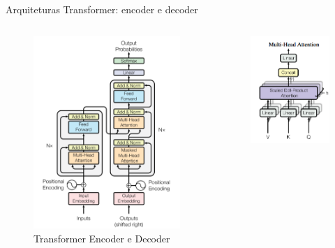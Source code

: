 \documentclass{beamer}
\begin{document}
\begin{frame}{Arquiteturas Transformer: encoder e decoder \cite{vaswani2017attention}}
\begin{columns}[t]	
	\begin{figure}
		\centering
		\includegraphics[height=0.75\textheight]{assets/Transformer.png}
		\caption{Transformer Encoder e Decoder}
	\end{figure}
	\begin{figure}
		\centering
		\includegraphics[height=0.75\textheight]{assets/transformer-multi-head-attention.png}

\end{figure}
\end{columns}
\end{frame}
\end{document}
